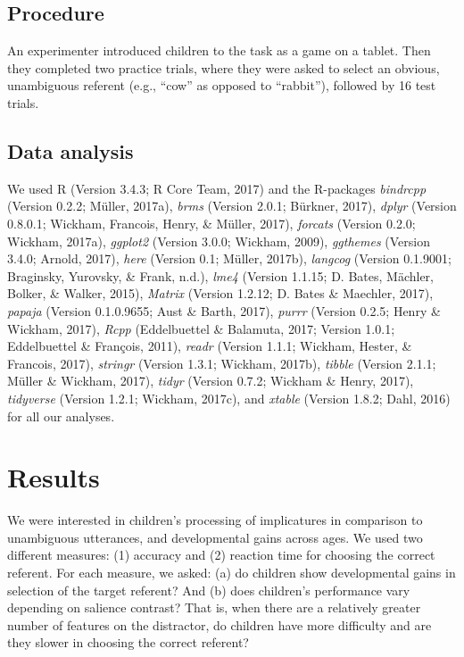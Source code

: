 \documentclass[mask,man]{apa6}
\begin{document}
\subsection{Procedure}\label{procedure}

An experimenter introduced children to the task as a game on a tablet.
Then they completed two practice trials, where they were asked to select
an obvious, unambiguous referent (e.g., \enquote{cow} as opposed to
\enquote{rabbit}), followed by 16 test trials.

\subsection{Data analysis}\label{data-analysis}

We used R (Version 3.4.3; R Core Team, 2017) and the R-packages
\emph{bindrcpp} (Version 0.2.2; Müller, 2017a), \emph{brms} (Version
2.0.1; Bürkner, 2017), \emph{dplyr} (Version 0.8.0.1; Wickham, Francois,
Henry, \& Müller, 2017), \emph{forcats} (Version 0.2.0; Wickham, 2017a),
\emph{ggplot2} (Version 3.0.0; Wickham, 2009), \emph{ggthemes} (Version
3.4.0; Arnold, 2017), \emph{here} (Version 0.1; Müller, 2017b),
\emph{langcog} (Version 0.1.9001; Braginsky, Yurovsky, \& Frank, n.d.),
\emph{lme4} (Version 1.1.15; D. Bates, Mächler, Bolker, \& Walker,
2015), \emph{Matrix} (Version 1.2.12; D. Bates \& Maechler, 2017),
\emph{papaja} (Version 0.1.0.9655; Aust \& Barth, 2017), \emph{purrr}
(Version 0.2.5; Henry \& Wickham, 2017), \emph{Rcpp} (Eddelbuettel \&
Balamuta, 2017; Version 1.0.1; Eddelbuettel \& François, 2011),
\emph{readr} (Version 1.1.1; Wickham, Hester, \& Francois, 2017),
\emph{stringr} (Version 1.3.1; Wickham, 2017b), \emph{tibble} (Version
2.1.1; Müller \& Wickham, 2017), \emph{tidyr} (Version 0.7.2; Wickham \&
Henry, 2017), \emph{tidyverse} (Version 1.2.1; Wickham, 2017c), and
\emph{xtable} (Version 1.8.2; Dahl, 2016) for all our analyses.

\section{Results}\label{results}

We were interested in children's processing of implicatures in
comparison to unambiguous utterances, and developmental gains across
ages. We used two different measures: (1) accuracy and (2) reaction time
for choosing the correct referent. For each measure, we asked: (a) do
children show developmental gains in selection of the target referent?
And (b) does children's performance vary depending on salience contrast?
That is, when there are a relatively greater number of features on the
distractor, do children have more difficulty and are they slower in
choosing the correct referent?
\end{document}
